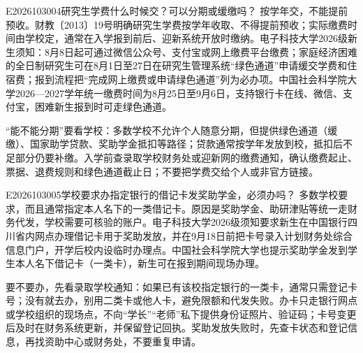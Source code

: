 \begin{qa}{E2026103004}{研究生学费什么时候交？可以分期或缓缴吗？}
按学年交，不能提前预收。财教〔2013〕19号明确研究生学费按学年收取、不得提前预收；实际缴费时间由学校定，通常在入学报到前后、迎新系统开放时缴纳。电子科技大学2026级新生须知：8月8日起可通过微信公众号、支付宝或网上缴费平台缴费；家庭经济困难的全日制研究生可在8月1日至27日在研究生管理系统“绿色通道”申请缓交学费和住宿费；报到流程把“完成网上缴费或申请绿色通道”列为必办项。中国社会科学院大学2026—2027学年统一缴费时间为8月25日至9月6日，支持银行卡在线、微信、支付宝，困难新生报到时可走绿色通道。

“能不能分期”要看学校：多数学校不允许个人随意分期，但提供绿色通道（缓缴）、国家助学贷款、奖助学金抵扣等路径；贷款通常按学年发放到校，抵扣后不足部分仍要补缴。入学前查录取学校财务处或迎新网的缴费通知，确认缴费起止、票据、退费规则和绿色通道截止日；不要把学费交给个人或非官方链接。
\end{qa}

\begin{qa}{E2026103005}{学校要求办指定银行的借记卡发奖助学金，必须办吗？}
多数学校要求，而且通常指定本人名下的一类借记卡。原因是奖助学金、助研津贴等统一走财务代发，学校需要可核验的账户。电子科技大学2026级须知要求新生在中国银行四川省内网点办理借记卡用于奖助发放，并在9月18日前把卡号录入计划财务处综合信息门户，开学后校内设临时办理点。中国社会科学院大学也提示奖助学金发到学生本人名下借记卡（一类卡），新生可在报到期间现场办理。

要不要办，先看录取学校通知：如果已有该校指定银行的一类卡，通常只需登记卡号；没有就去办，别用二类卡或他人卡，避免限额和代发失败。办卡只走银行网点或学校组织的现场点，不向“学长”“老师”私下提供身份证照片、验证码；卡号变更后及时在财务系统更新，并保留登记回执。奖助发放失败时，先查卡状态和登记信息，再找资助中心或财务处，不要重复申请。
\end{qa}
